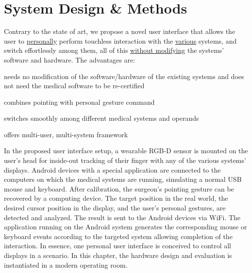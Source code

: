 \section{System Design \& Methods}
Contrary to the state of art, we propose a novel user interface that allows the user to \underline{personally} perform touchless interaction with the \underline{various}  systems, and switch effortlessly among them, all of this \underline{without modifying} the systems' software and hardware. The advantages are: 
\begin{description} [font=$\bullet$\scshape\bfseries]
	\item needs no modification of the software/hardware of the existing systems and does not need the medical software to be re-certified
	\item combines pointing with personal gesture command
	\item switches smoothly among different medical systems and operands
	\item offers multi-user, multi-system framework
\end{description}
In the proposed user interface setup, a wearable RGB-D sensor is mounted on the user's head for inside-out tracking of their finger with any of the various systems' displays. Android devices with a special application are connected to the computers on which the medical systems are running, simulating a normal USB mouse and keyboard. 
After calibration, the surgeon's pointing gesture can be recovered by a computing device. The target position in the real world, the desired cursor position in the display, and the user's personal gestures, are detected and analyzed. The result is sent to the Android devices via WiFi. The application running on the Android system generates the corresponding mouse or keyboard events according to the targeted system allowing completion of the interaction. In essence, one personal user interface is conceived to control all displays in a scenario. In this chapter, the hardware design and evaluation is instantiated in a modern operating room. 

